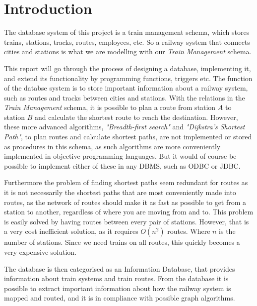 \section{Introduction}

The database system of this project is a train management schema, which stores 
trains, stations, tracks, routes, employees, etc. So a railway system that 
connects cities and stations is what we are modelling with our \emph{Train 
Management} schema.

This report will go through the process of designing a database, implementing 
it, and extend its functionality by programming functions, triggers etc.
The function of the databse system is to store important information about a 
railway system, such as routes and tracks between cities and stations. With the 
relations in the \emph{Train Management} schema, it is possible to plan a route 
from station $A$ to station $B$ and calculate the shortest route to 
reach the destination. However, these more advanced algorithms, 
\textit{"Breadth-first search"} and \textit{"Dijkstra's Shortest Path"}, to 
plan routes and calculate shortest paths, are not implemented or stored as 
procedures in this schema, as such algorithms are more conveniently implemented 
in objective programming languages. But it would of course be possible to 
implement either of these in any DBMS, such as ODBC or JDBC.


Furthermore the problem of finding shortest paths seem redundant for routes as it is not necessarily the shortest paths that are 
most conveniently made into routes, as the network of routes should make it as 
fast as possible to get from a station to another, regardless of where you are 
moving from and to. This problem is easily solved by having routes between 
every pair of stations. However, that is a very cost inefficient solution, as 
it requires $O(n^2)$ routes. Where $n$ is the number of stations. Since we need 
trains on all routes, this quickly becomes a very expensive solution. 

The database is then categorised as an Information Database, that provides information about train systems and train routes. From the database it is possible to extract important information about how the railway system is mapped and routed, and it is in compliance with possible graph algorithms.



